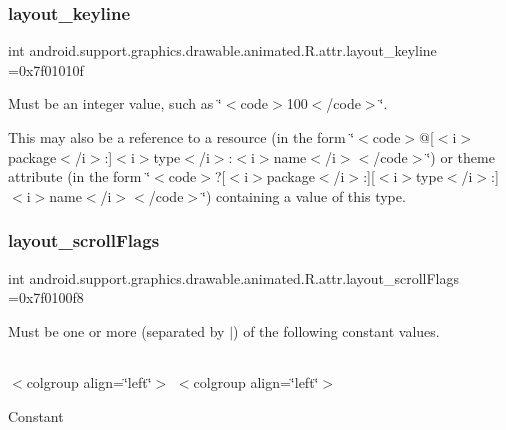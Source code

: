 \subsubsection{\texorpdfstring{layout\+\_\+keyline}{layout\_keyline}}
{\footnotesize\ttfamily int android.\+support.\+graphics.\+drawable.\+animated.\+R.\+attr.\+layout\+\_\+keyline =0x7f01010f\hspace{0.3cm}{\ttfamily [static]}}

Must be an integer value, such as \char`\"{}$<$code$>$100$<$/code$>$\char`\"{}. 

This may also be a reference to a resource (in the form \char`\"{}$<$code$>$@\mbox{[}$<$i$>$package$<$/i$>$\+:\mbox{]}$<$i$>$type$<$/i$>$\+:$<$i$>$name$<$/i$>$$<$/code$>$\char`\"{}) or theme attribute (in the form \char`\"{}$<$code$>$?\mbox{[}$<$i$>$package$<$/i$>$\+:\mbox{]}\mbox{[}$<$i$>$type$<$/i$>$\+:\mbox{]}$<$i$>$name$<$/i$>$$<$/code$>$\char`\"{}) containing a value of this type. \mbox{\label{classandroid_1_1support_1_1graphics_1_1drawable_1_1animated_1_1R_1_1attr_ac5528e3c81e8f85c2285fe0c10e601c9}} 
\subsubsection{\texorpdfstring{layout\+\_\+scroll\+Flags}{layout\_scrollFlags}}
{\footnotesize\ttfamily int android.\+support.\+graphics.\+drawable.\+animated.\+R.\+attr.\+layout\+\_\+scroll\+Flags =0x7f0100f8\hspace{0.3cm}{\ttfamily [static]}}

Must be one or more (separated by \textquotesingle{}$\vert$\textquotesingle{}) of the following constant values.

\tabulinesep=1mm
\begin{longtabu} spread 0pt [c]{*{0}{|X[-1]}|}
\hline
\end{longtabu}
$<$colgroup align=\char`\"{}left\char`\"{}$>$ $<$colgroup align=\char`\"{}left\char`\"{}$>$ 

Constant

